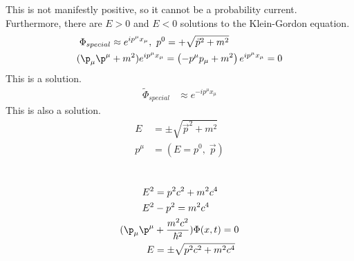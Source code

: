 \documentclass[a4paper, 11pt, normalem]{report}
\begin{document}
This is not manifestly positive, so it cannot be a probability current.
Furthermore, there are $E > 0$ and $E < 0$ solutions to the Klein-Gordon equation.
\begin{align}
    \Phi_{special} &\approx e^{ip^\mu x_\mu},~ p^0 = +\sqrt{\vec{p}^2 + m^2} \\
    (\p_\mu\p^\mu &+ m^2)e^{ip^\mu x_\mu} = \left(-p^\mu p_\mu + m^2\right)e^{ip^\mu x_\mu} = 0 
\end{align}
This is a solution. 
\begin{align}
    \tilde{\Phi}_{special} &\approx e^{-ip^\mu x_\mu}
\end{align} 
This is also a solution.
\begin{align}
    E &= \pm \sqrt{\vec{p}^2 + m^2} \\
    p^\mu &= (E=p^0,\; \vec{p})
\end{align}

\chapter{}
\begin{align}
    E^2 &= p^2c^2 + m^2c^4 \\
    E^2 &- p^2 = m^2c^4 \\
    (\p_\mu\p^\mu &+ \frac{m^2c^2}{\hbar^2})\Phi(x,t) = 0 \\
    E &= \pm \sqrt{p^2c^2 + m^2c^4}
\end{align}
\end{document}
